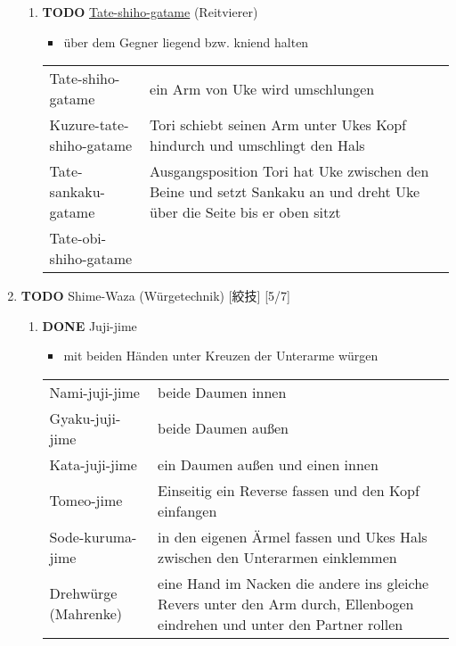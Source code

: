\documentclass[11pt]{article}
\begin{document}
\begin{enumerate}
\begin{enumerate}
\item {\bfseries\sffamily TODO} \hyperref[orgb3d4b16]{Tate-shiho-gatame} (Reitvierer)
\label{sec:orga67a830}

\begin{itemize}
\item über dem Gegner liegend bzw. kniend halten
\end{itemize}

\begin{center}
\begin{tabular}{ll}
\label{orgb3d4b16}Tate-shiho-gatame & ein Arm von Uke wird umschlungen\\
\label{org7e39a78}Kuzure-tate-shiho-gatame & Tori schiebt seinen Arm unter Ukes Kopf hindurch und umschlingt den Hals\\
\label{org9ca201f}Tate-sankaku-gatame & Ausgangsposition Tori hat Uke zwischen den Beine und setzt Sankaku an und dreht Uke über die Seite bis er oben sitzt\\
\label{org6cec0f2}Tate-obi-shiho-gatame & \\
\end{tabular}
\end{center}
\end{enumerate}


\item {\bfseries\sffamily TODO} Shime-Waza (Würgetechnik) [絞技] [5/7]
\label{sec:org23b3ec4}

\begin{enumerate}
\item {\bfseries\sffamily DONE} Juji-jime
\label{sec:org422b1ae}
\begin{itemize}
\item mit beiden Händen unter Kreuzen der Unterarme würgen
\end{itemize}

\begin{center}
\begin{tabular}{ll}
\label{org872312a}Nami-juji-jime & beide Daumen innen\\
\label{orgd4a5a2b}Gyaku-juji-jime & beide Daumen außen\\
\label{org464a722}Kata-juji-jime & ein Daumen außen und einen innen\\
\label{org76eba16}Tomeo-jime & Einseitig ein Reverse fassen und den Kopf einfangen\\
\label{orgdc4236f}Sode-kuruma-jime & in den eigenen Ärmel fassen und Ukes Hals zwischen den Unterarmen einklemmen\\
\label{org4fedd56}Drehwürge (Mahrenke) & eine Hand im Nacken die andere ins gleiche Revers unter den Arm durch, Ellenbogen eindrehen und unter den Partner rollen\\
\end{tabular}
\end{center}


\end{enumerate}
\end{enumerate}
\end{document}
